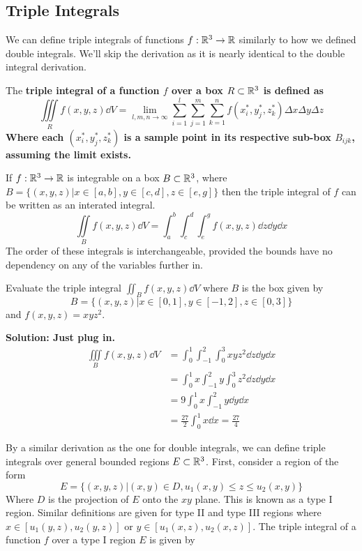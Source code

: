 \subsection{Triple Integrals}
We can define triple integrals of functions $f: \mathbb{R}^3\to\mathbb{R}$ similarly to how we defined double integrals. We'll skip the derivation as it is nearly identical to the double integral derivation. \par
The \bf{triple integral} of a function $f$ over a box $R\subset \mathbb{R}^3$ is defined as
\[ \iiint\limits_R f(x,y,z)\dd V = \lim_{l,m,n\to\infty}\sum_{i=1}^{l}\sum_{j=1}^m\sum_{k=1}^n f(x_i^*, y_j^*, z_k^*)\Delta x\Delta y\Delta z \]
Where each $(x_i^*, y_j^*, z_k^*)$ is a sample point in its respective sub-box $B_{ijk}$, assuming the limit exists. 
\begin{theorem}
    If $f: \mathbb{R}^3\to \mathbb{R}$ is integrable on a box $B\subset \mathbb{R}^3$, where $B = \{(x,y,z)|x\in[a,b], y\in[c,d],z\in[e,g]\}$ then the triple integral of $f$ can be written as an interated integral.
    \[ \iint\limits_Bf(x,y,z)\dd V = \int_a^b\int_c^d\int_e^gf(x,y,z)\dd z\dd y\dd x\]
    The order of these integrals is interchangeable, provided the bounds have no dependency on any of the variables further in.
\end{theorem}
\begin{example}
    Evaluate the triple integral $\iint_Bf(x,y,z)\dd V$ where $B$ is the box given by
    \[ B = \{(x,y,z)|x\in[0,1],y\in[-1,2],z\in[0,3]\} \]
    and $f(x,y,z) = xyz^2$. \par
    \bf{Solution: }Just plug in.
    \begin{align*}
        \iiint\limits_B f(x,y,z)\dd V &= \int_0^1\int_{-1}^2\int_0^3xyz^2 \dd z\dd y\dd x \\
        &= \int_0^1x\int_{-1}^2y\int_0^3z^2\dd z\dd y\dd x \\
        &= 9\int_0^1x\int_{-1}^2 y\dd y\dd x \\
        &= \frac{27}{2}\int_0^1x\dd x = \boxed{\frac{27}{4}}
    \end{align*}
\end{example}
By a similar derivation as the one for double integrals, we can define triple integrals over general bounded regions $E\subset \mathbb{R}^3$. First, consider a region of the form
\[ E = \{(x,y,z)|(x,y)\in D, u_1(x,y) \leq z \leq u_2(x,y)\} \]
Where $D$ is the projection of $E$ onto the $xy$ plane. This is known as a type I region. Similar definitions are given for type II and type III regions where $x\in[u_1(y,z),u_2(y,z)]$ or $y\in[u_1(x,z),u_2(x,z)]$. The triple integral of a function $f$ over a type I region $E$ is given by
